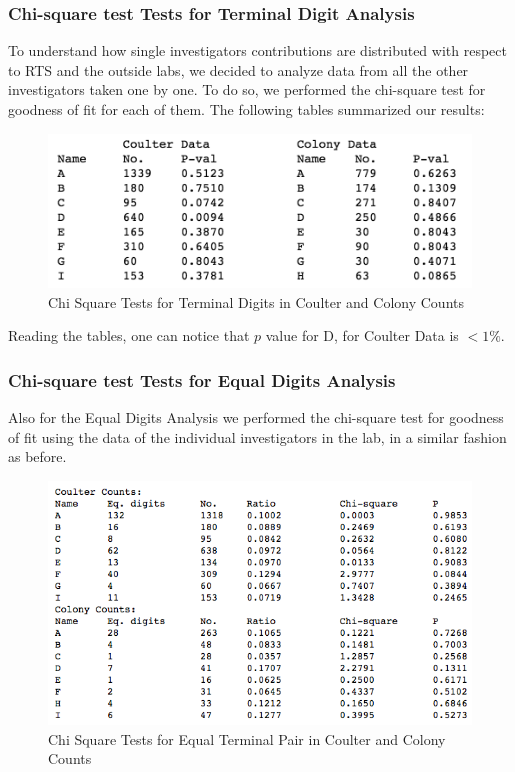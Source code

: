 \documentclass{article}
\begin{document}
    \subsubsection{Chi-square test Tests for Terminal Digit
Analysis}\label{chi-square-test-tests-for-terminal-digit-analysis}

To understand how single investigators contributions are distributed
with respect to RTS and the outside labs, we decided to analyze data
from all the other investigators taken one by one. To do so, we
performed the chi-square test for goodness of fit for each of them. The
following tables summarized our results:

\begin{figure}[H]
\centering
\includegraphics[width=0.7\linewidth]{images/raaz_term_chi_summary.png}
\caption{Chi Square Tests for Terminal Digits in Coulter and Colony
Counts}
\end{figure}

Reading the tables, one can notice that $p$ value for D, for Coulter Data is $<1\%$.

    \subsubsection{Chi-square test Tests for Equal Digits
Analysis}\label{chi-square-test-tests-for-equal-digits-analysis}

Also for the Equal Digits Analysis we performed the chi-square test for
goodness of fit using the data of the individual investigators in the
lab, in a similar fashion as before.
\begin{figure}[H]
\centering
\includegraphics[width=0.9\linewidth]{images/raaz_eq_chi_elaborate.png}
\caption{Chi Square Tests for Equal Terminal Pair in Coulter and Colony
Counts}
\end{figure}
\end{document}
